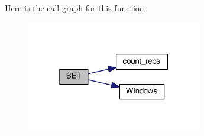 Here is the call graph for this function\+:
\nopagebreak
\begin{figure}[H]
\begin{center}
\leavevmode
\includegraphics[width=217pt]{srclib_2apr_2CMakeLists_8txt_a17aaf78163cc7f4f420047c877c050fa_cgraph}
\end{center}
\end{figure}


